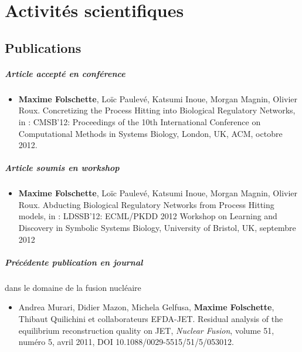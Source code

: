 \chapter{Activités scientifiques}

\section{Publications}

\paragraph{Article accepté en conférence}
\begin{itemize}
\item[] \textbf{Maxime Folschette}, Loïc Paulevé, Katsumi Inoue, Morgan Magnin, Olivier Roux.
Concretizing the Process Hitting into Biological Regulatory Networks,
in : CMSB'12\!\!: Proceedings of the 10th International Conference on Computational Methods in Systems Biology,
London, UK, ACM, octobre 2012.
\end{itemize}

\paragraph{Article soumis en workshop}
\begin{itemize}
\item[] \textbf{Maxime Folschette}, Loïc Paulevé, Katsumi Inoue, Morgan Magnin, Olivier Roux.
Abducting Biological Regulatory Networks from Process Hitting models,
in : LDSSB'12\!\!: ECML/PKDD 2012 Workshop on Learning and Discovery in Symbolic Systems Biology,
University of Bristol, UK, septembre 2012
\end{itemize}

\paragraph{Précédente publication en journal} dans le domaine de la fusion nucléaire
\begin{itemize}
\item[] Andrea Murari, Didier Mazon, Michela Gelfusa, \textbf{Maxime Folschette}, Thibaut Quilichini et collaborateurs EFDA-JET.
Residual analysis of the equilibrium reconstruction quality on JET, \textit{Nuclear Fusion},
volume 51, numéro 5, avril 2011, DOI 10.1088/0029-5515/51/5/053012.
\end{itemize}



